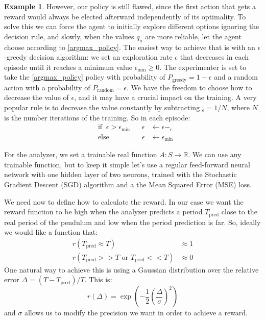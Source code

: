 \documentclass[11pt,a4paper,twoside]{report}
\newcommand{\+}{\textnormal{+} }
\theoremstyle{definition}
\newtheorem{myex}[mythm]{Example}
\numberwithin{equation}{chapter}
\begin{document}
\begin{myex}
However, our policy is still flawed, since the first action that gets a reward
would always be elected afterward independently of its optimality. To solve this
we can force the agent to initially explore different options ignoring the
decision rule, and slowly, when the values $q_a$ are more reliable, let the
agent choose according to \eqref{argmax_policy}. The easiest way to achieve that
is with an $\epsilon$-greedy decision algorithm: we set an exploration rate
$\epsilon$ that decreases in each episode until it reaches a minimum value
$\epsilon_\text{min}\geq 0$. The experimenter is set to take the
\eqref{argmax_policy} policy with probability of $P_{\text{greedy}}=1-\epsilon$
and a random action with a probability of $P_{\text{random}}=\epsilon$. We have
the freedom to choose how to decrease the value of $\epsilon$, and it may have a
crucial impact on the training. A very popular rule is to decrease the value
constantly by subtracting $_\epsilon = 1/N$, where $N$ is the number iterations
of the training. So in each episode:
\begin{align}
  &\text{if}\; \; \epsilon > \epsilon_\text{min} \;\;\; &\epsilon&\leftarrow\epsilon - _\epsilon \\
  &\text{else} \; \;  &\epsilon &\leftarrow \epsilon_\text{min}
\end{align} 


For the analyzer, we set a trainable real function $A: S \rightarrow
\mathbb{R}$. We can use any trainable function, but to keep it simple let's use
a regular feed-forward neural network with one hidden layer of two neurons,
trained with the Stochastic Gradient Descent (SGD) algorithm and a the Mean
Squared Error (MSE) loss.

We need now to define how to calculate the reward.  In our case we want the
reward function to be high when the analyzer predicts a period $T_\text{pred}$
close to the real period of the pendulum and low when the period prediction is
far. So, ideally we would like a function that:
\begin{align}
       r(T_{\text{pred}} \approx T) &\approx 1\\
       r(T_{\text{pred}}>> T \text{ or } T_{\text{pred}} << T) & \approx 0
\end{align}
One natural way to achieve this is using a Gaussian distribution over the
relative error $\Delta=(T-T_{\text{pred}})/T$. This is:
\begin{equation}
   r(\Delta)=\exp\left(-\frac{1}{2}\left( \frac{\Delta}{\sigma} \right) ^2\right)
  \label{gaussian_reward}
\end{equation}
and $\sigma$ allows us to modify the precision we want in order to achieve a 
reward.


\end{myex}
\end{document}
